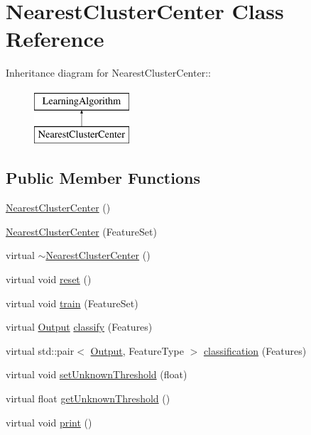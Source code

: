 \hypertarget{classNearestClusterCenter}{
\section{NearestClusterCenter Class Reference}
\label{classNearestClusterCenter}
}
Inheritance diagram for NearestClusterCenter::\begin{figure}[H]
\begin{center}
\leavevmode
\includegraphics[height=2cm]{classNearestClusterCenter}
\end{center}
\end{figure}
\subsection*{Public Member Functions}
\begin{DoxyCompactItemize}
\item 
\hyperlink{classNearestClusterCenter_a91e3450a7df8ef80a80ea9803671bb1e}{NearestClusterCenter} ()
\item 
\hyperlink{classNearestClusterCenter_ae3f8e71ca34ae2e0187395c38045f041}{NearestClusterCenter} (FeatureSet)
\item 
virtual \hyperlink{classNearestClusterCenter_a8b6f7f60937d0e860b117d774d645928}{$\sim$NearestClusterCenter} ()
\item 
virtual void \hyperlink{classNearestClusterCenter_ab5f85125ff65850ca4673fa0e85a0af5}{reset} ()
\item 
virtual void \hyperlink{classNearestClusterCenter_af3a9ba6b9ef3fb453ff10e76fe34e9d4}{train} (FeatureSet)
\item 
virtual \hyperlink{structOutput}{Output} \hyperlink{classNearestClusterCenter_ad2df5aaa3dabc0ef398a24872937b878}{classify} (Features)
\item 
virtual std::pair$<$ \hyperlink{structOutput}{Output}, FeatureType $>$ \hyperlink{classNearestClusterCenter_a49853a2af22ba1688ac438a376d53c42}{classification} (Features)
\item 
virtual void \hyperlink{classNearestClusterCenter_ab902e7abfb704d132d8548672253bb0a}{setUnknownThreshold} (float)
\item 
virtual float \hyperlink{classNearestClusterCenter_aad9b89686794d4b974b38e3aac7bb51e}{getUnknownThreshold} ()
\item 
virtual void \hyperlink{classNearestClusterCenter_a9ae11b14356f29dcf5fa2666dac6faed}{print} ()
\end{DoxyCompactItemize}


